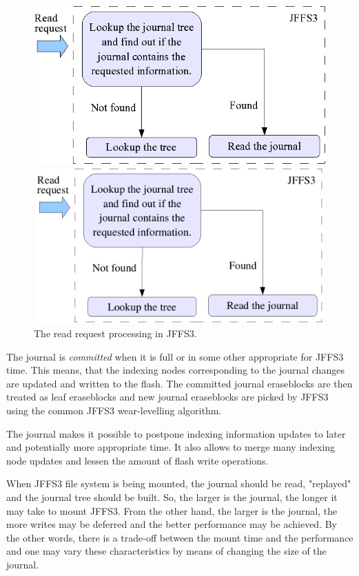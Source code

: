 \documentclass[12pt,a4paper,oneside,titlepage]{article}
\begin{document}
%
%
\begin{figure}[h]
\begin{center}
\begin{htmlonly}
\includegraphics{pics/journal-02.png}
\end{htmlonly}
\includegraphics[width=130mm,height=60mm]{pics/journal-02.pdf}
\end{center}
\caption{The read request processing in JFFS3.}
\label{ref_FigureJournal_02}
\end{figure}

The journal is \emph{committed} when it is full or in some other appropriate
for JFFS3 time. This means, that the indexing nodes corresponding to the
journal changes are updated and written to the flash.  The committed
journal eraseblocks are then treated as leaf eraseblocks and new journal
eraseblocks are picked by JFFS3 using the common JFFS3
\mbox{wear-levelling} algorithm.

The journal makes it possible to postpone indexing information updates to later
and potentially more appropriate time. It also allows to merge many indexing
node updates and lessen the amount of flash write operations.

When JFFS3 file system is being mounted, the journal should be read, "replayed"
and the journal tree should be built. So, the larger is the journal, the longer
it may take to mount JFFS3. From the other hand, the larger is the journal, the
more writes may be deferred and the better performance may be achieved. By the
other words, there is a \mbox{trade-off} between the mount time and the
performance and one may vary these characteristics by means of changing the
size of the journal.
\end{document}
